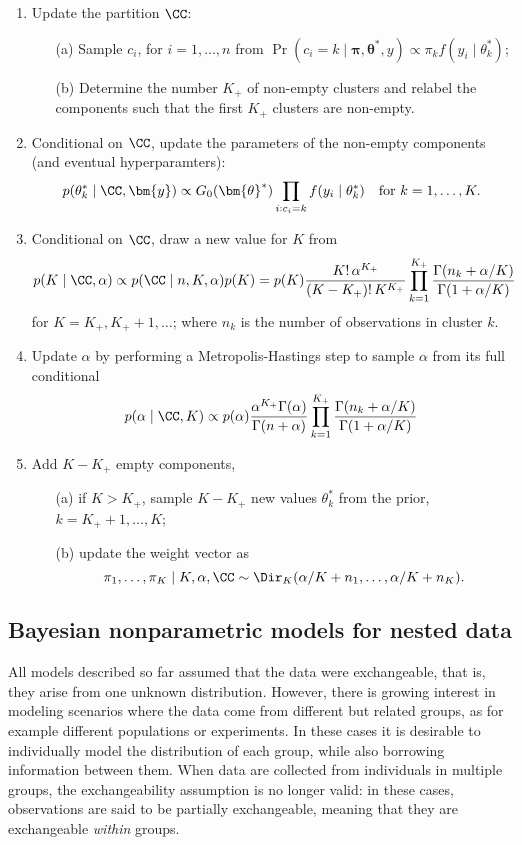\begin{enumerate}
	\item Update the partition $\CC$:
	\begin{enumerate}
		\item[(a)] Sample $c_i$, for $i=1,\dots,n$ from $\Pr(c_i = k \mid \bm{\pi}, \bm{\theta}^*, y)\propto \pi_k f(y_i\mid\theta^*_k)$;
		\item[(b)] Determine the number $K_+$ of non-empty clusters and relabel the components such that the first $K_+$ clusters are non-empty.
	\end{enumerate}
	\item Conditional on $\CC$, update the parameters of the non-empty components (and eventual hyperparamters): $$p(\theta^*_k\mid \CC,\bm{y}) \propto G_0(\bm{\theta}^*) \prod_{i:c_i=k} f(y_i\mid\theta^*_k)\quad \text{for } k = 1,\dots,K.$$
	\item Conditional on $\CC$, draw a new value for $K$ from
	\begin{equation*}
	p(K\mid \CC, \alpha) \propto p(\CC\mid n, K, \alpha) p(K) = p(K) \frac{K!\,\alpha^{K_+}}{(K-K_+)!\,K^{K_+}} \prod_{k=1}^{K_+} \frac{\Gamma(n_k + \alpha/K)}{\Gamma(1+\alpha/K)}
	\end{equation*}
	for $K = K_+, K_++1,\dots$; where $n_k$ is the number of observations in cluster $k$.
	\item Update $\alpha$ by performing a Metropolis-Hastings step to sample $\alpha$ from its full conditional 
	$$ p(\alpha\mid\CC,K) \propto p(\alpha) \frac{\alpha^{K_+}\Gamma(\alpha)}{\Gamma(n+\alpha)} \prod_{k=1}^{K_+} \frac{\Gamma(n_k + \alpha/K)}{\Gamma(1+\alpha/K)} $$
	\item Add $K-K_+$ empty components,
	\begin{itemize}
		\item[(a)] if $K>K_+$, sample $K-K_+$ new values $\theta^*_k$ from the prior, $k = K_+ + 1,\dots,K$;
		\item[(b)] update the weight vector as $$\pi_1,\dots,\pi_K \mid K, \alpha, \CC \sim \Dir_K(\alpha/K + n_1, \dots, \alpha/K + n_K).$$ 
	\end{itemize}
\end{enumerate}




\subsection{Bayesian nonparametric models for nested data}
All models described so far assumed that the data were exchangeable, that is, they arise from one unknown distribution. However, there is growing interest in modeling scenarios where the data come from different but related groups, as for example different populations or experiments. In these cases it is desirable to individually model the distribution of each group, while also borrowing information between them.
When data are collected from individuals in multiple groups, the exchangeability assumption is no longer valid: in these cases, observations are said to be partially exchangeable, meaning that they are exchangeable \textit{within} groups.

